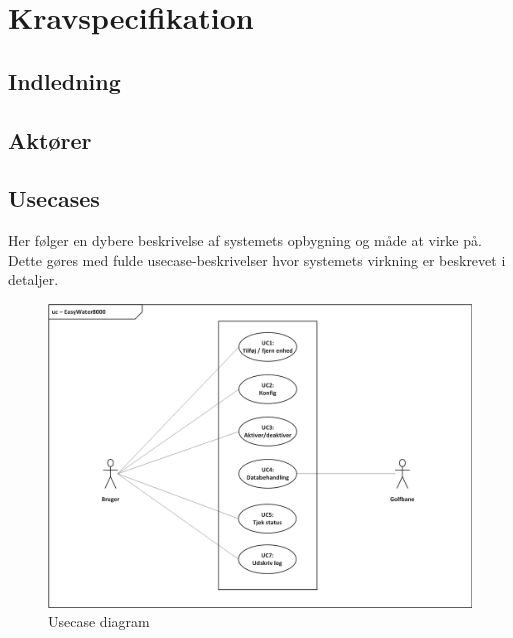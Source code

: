\chapter{Kravspecifikation}

\section{Indledning}


\newpage
\section{Aktører}


\newpage
\section{Usecases}\label{header:usecases}

Her følger en dybere beskrivelse af systemets opbygning og måde at virke på. Dette gøres med fulde usecase-beskrivelser hvor systemets virkning er beskrevet i detaljer.

\begin{figure}[H] \centering
\vspace*{\fill}
\includegraphics[width=\textwidth]{filer/kravspec/visio/Usecase_Diagram}
\caption{Usecase diagram}
\label{lab:usecasediagram}
\vspace*{\fill}
\end{figure}


\newpage

